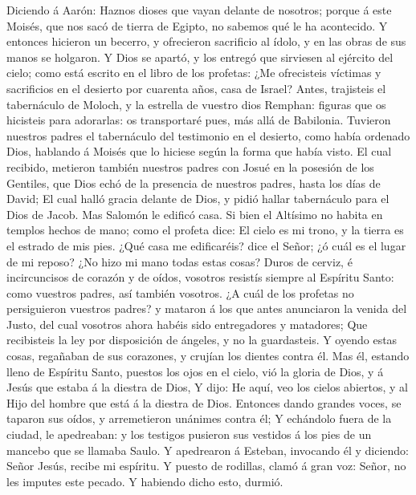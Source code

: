Diciendo á Aarón: Haznos dioses que vayan delante de nosotros; porque á
este Moisés, que nos sacó de tierra de Egipto, no sabemos qué le ha
acontecido.  Y entonces hicieron un becerro, y ofrecieron
sacrificio al ídolo, y en las obras de sus manos se holgaron.
 Y Dios se apartó, y los entregó que sirviesen al
ejército del cielo; como está escrito en el libro de los profetas: ¿Me
ofrecisteis víctimas y sacrificios en el desierto por cuarenta años,
casa de Israel?  Antes, trajisteis el tabernáculo de
Moloch, y la estrella de vuestro dios Remphan: figuras que os hicisteis
para adorarlas: os transportaré pues, más allá de Babilonia.
 Tuvieron nuestros padres el tabernáculo del testimonio
en el desierto, como había ordenado Dios, hablando á Moisés que lo
hiciese según la forma que había visto.  El cual
recibido, metieron también nuestros padres con Josué en la posesión de
los Gentiles, que Dios echó de la presencia de nuestros padres, hasta
los días de David;  El cual halló gracia delante de Dios,
y pidió hallar tabernáculo para el Dios de Jacob.  Mas
Salomón le edificó casa.  Si bien el Altísimo no habita
en templos hechos de mano; como el profeta dice:  El
cielo es mi trono, y la tierra es el estrado de mis pies. ¿Qué casa me
edificaréis? dice el Señor; ¿ó cuál es el lugar de mi reposo?
 ¿No hizo mi mano todas estas cosas? 
Duros de cerviz, é incircuncisos de corazón y de oídos, vosotros
resistís siempre al Espíritu Santo: como vuestros padres, así también
vosotros.  ¿A cuál de los profetas no persiguieron
vuestros padres? y mataron á los que antes anunciaron la venida del
Justo, del cual vosotros ahora habéis sido entregadores y matadores;
 Que recibisteis la ley por disposición de ángeles, y no
la guardasteis.  Y oyendo estas cosas, regañaban de sus
corazones, y crujían los dientes contra él.  Mas él,
estando lleno de Espíritu Santo, puestos los ojos en el cielo, vió la
gloria de Dios, y á Jesús que estaba á la diestra de Dios,
 Y dijo: He aquí, veo los cielos abiertos, y al Hijo del
hombre que está á la diestra de Dios.  Entonces dando
grandes voces, se taparon sus oídos, y arremetieron unánimes contra él;
 Y echándolo fuera de la ciudad, le apedreaban: y los
testigos pusieron sus vestidos á los pies de un mancebo que se llamaba
Saulo.  Y apedrearon á Esteban, invocando él y diciendo:
Señor Jesús, recibe mi espíritu.  Y puesto de rodillas,
clamó á gran voz: Señor, no les imputes este pecado. Y habiendo dicho
esto, durmió.


